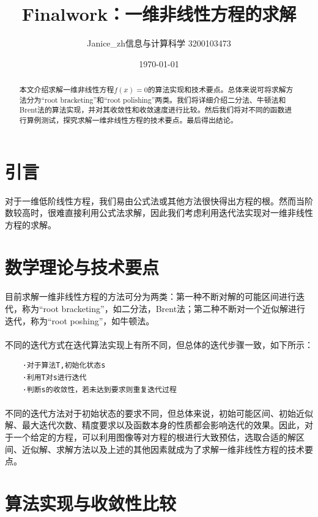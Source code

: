 \documentclass{article}
\title{Finalwork：一维非线性方程的求解}
\author{Janice\_zh\quad 信息与计算科学 3200103473}
\date{\today}
\begin{document}
	\maketitle   %
	
	\renewcommand{\abstractname}{摘要}
	\begin{abstract}
		本文介绍求解一维非线性方程$f(x)=0$的算法实现和技术要点。总体来说可将求解方法分为``root bracketing''和``root polishing''两类。我们将详细介绍二分法、牛顿法和Brent法的算法实现，并对其收敛性和收敛速度进行比较。然后我们将对不同的函数进行算例测试，探究求解一维非线性方程的技术要点。最后得出结论。\cite{R3}
	\end{abstract}
	\section{引言}
	对于一维低阶线性方程，我们易由公式法或其他方法很快得出方程的根。然而当阶数较高时，很难直接利用公式法求解，因此我们考虑利用迭代法实现对一维非线性方程的求解。
	\section{数学理论与技术要点}
	\paragraph{}目前求解一维非线性方程的方法可分为两类：第一种不断对解的可能区间进行迭代，称为``root bracketing''，如二分法，Brent法；第二种不断对一个近似解进行迭代，称为``root poshing''，如牛顿法。
	\paragraph{}不同的迭代方式在迭代算法实现上有所不同，但总体的迭代步骤一致，如下所示：
	\begin{verbatim}
	·对于算法T,初始化状态s
	·利用T对s进行迭代
	·判断s的收敛性，若未达到要求则重复迭代过程
	\end{verbatim}
	\paragraph{}
	不同的迭代方法对于初始状态的要求不同，但总体来说，初始可能区间、初始近似解、最大迭代次数、精度要求以及函数本身的性质都会影响迭代的效果。因此，对于一个给定的方程，可以利用图像等对方程的根进行大致预估，选取合适的解区间、近似解、求解方法以及上述的其他因素就成为了求解一维非线性方程的技术要点。
	\section{算法实现与收敛性比较}
\end{document}
